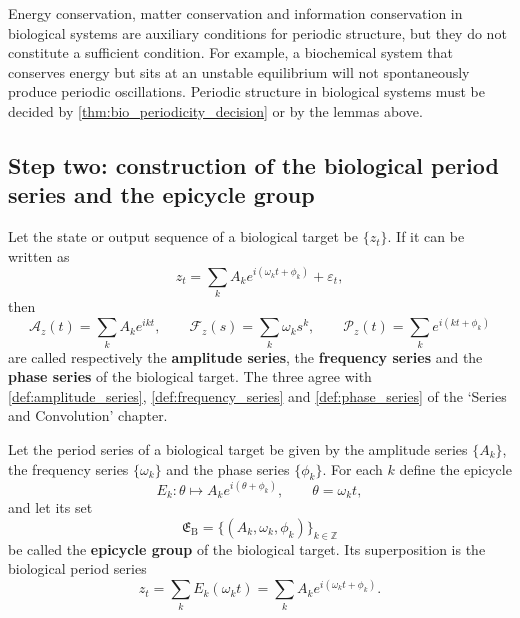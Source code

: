\begin{remark}\label{rem:bio_invariant_not_period}
Energy conservation, matter conservation and information conservation in biological systems are auxiliary conditions for periodic structure, but they do not constitute a sufficient condition. For example, a biochemical system that conserves energy but sits at an unstable equilibrium will not spontaneously produce periodic oscillations. Periodic structure in biological systems must be decided by \cref{thm:bio_periodicity_decision} or by the lemmas above.
\end{remark}

\subsection{Step two: construction of the biological period series and the epicycle group}

\begin{definition}\label{def:bio_series}
Let the state or output sequence of a biological target be $\{z_t\}$. If it can be written as
\[
z_t=\sum_k A_k e^{i(\omega_k t+\phi_k)}+\varepsilon_t,
\]
then
\[
\mathcal A_z(t)=\sum_k A_k e^{ikt},\qquad
\mathcal F_z(s)=\sum_k \omega_k s^k,\qquad
\mathcal P_z(t)=\sum_k e^{i(kt+\phi_k)}
\]
are called respectively the \textbf{amplitude series}, the \textbf{frequency series} and the \textbf{phase series} of the biological target. The three agree with \cref{def:amplitude_series}, \cref{def:frequency_series} and \cref{def:phase_series} of the `Series and Convolution' chapter.
\end{definition}

\begin{definition}\label{def:bio_epicycle_group}
Let the period series of a biological target be given by the amplitude series $\{A_k\}$, the frequency series $\{\omega_k\}$ and the phase series $\{\phi_k\}$. For each $k$ define the epicycle
\[
E_k:\theta\mapsto A_k e^{i(\theta+\phi_k)},\qquad \theta=\omega_k t,
\]
and let its set
\[
\mathfrak E_{\mathrm{B}}=\{(A_k,\omega_k,\phi_k)\}_{k\in\mathbb Z}
\]
be called the \textbf{epicycle group} of the biological target. Its superposition is the biological period series
\[
z_t=\sum_k E_k(\omega_k t)=\sum_k A_k e^{i(\omega_k t+\phi_k)}.
\]
\end{definition}

